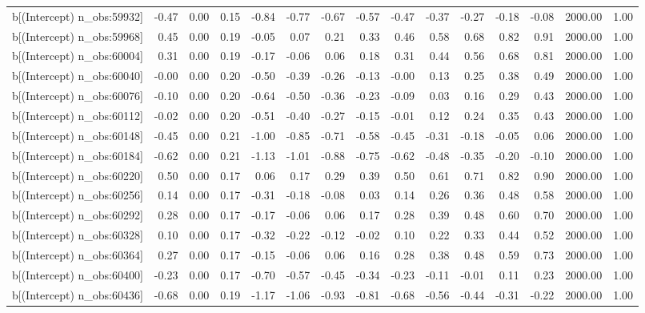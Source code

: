 \begin{table}[ht]
\begin{tabular}{rrrrrrrrrrrrrrr}
  b[(Intercept) n\_obs:59932] & -0.47 & 0.00 & 0.15 & -0.84 & -0.77 & -0.67 & -0.57 & -0.47 & -0.37 & -0.27 & -0.18 & -0.08 & 2000.00 & 1.00 \\ 
  b[(Intercept) n\_obs:59968] & 0.45 & 0.00 & 0.19 & -0.05 & 0.07 & 0.21 & 0.33 & 0.46 & 0.58 & 0.68 & 0.82 & 0.91 & 2000.00 & 1.00 \\ 
  b[(Intercept) n\_obs:60004] & 0.31 & 0.00 & 0.19 & -0.17 & -0.06 & 0.06 & 0.18 & 0.31 & 0.44 & 0.56 & 0.68 & 0.81 & 2000.00 & 1.00 \\ 
  b[(Intercept) n\_obs:60040] & -0.00 & 0.00 & 0.20 & -0.50 & -0.39 & -0.26 & -0.13 & -0.00 & 0.13 & 0.25 & 0.38 & 0.49 & 2000.00 & 1.00 \\ 
  b[(Intercept) n\_obs:60076] & -0.10 & 0.00 & 0.20 & -0.64 & -0.50 & -0.36 & -0.23 & -0.09 & 0.03 & 0.16 & 0.29 & 0.43 & 2000.00 & 1.00 \\ 
  b[(Intercept) n\_obs:60112] & -0.02 & 0.00 & 0.20 & -0.51 & -0.40 & -0.27 & -0.15 & -0.01 & 0.12 & 0.24 & 0.35 & 0.43 & 2000.00 & 1.00 \\ 
  b[(Intercept) n\_obs:60148] & -0.45 & 0.00 & 0.21 & -1.00 & -0.85 & -0.71 & -0.58 & -0.45 & -0.31 & -0.18 & -0.05 & 0.06 & 2000.00 & 1.00 \\ 
  b[(Intercept) n\_obs:60184] & -0.62 & 0.00 & 0.21 & -1.13 & -1.01 & -0.88 & -0.75 & -0.62 & -0.48 & -0.35 & -0.20 & -0.10 & 2000.00 & 1.00 \\ 
  b[(Intercept) n\_obs:60220] & 0.50 & 0.00 & 0.17 & 0.06 & 0.17 & 0.29 & 0.39 & 0.50 & 0.61 & 0.71 & 0.82 & 0.90 & 2000.00 & 1.00 \\ 
  b[(Intercept) n\_obs:60256] & 0.14 & 0.00 & 0.17 & -0.31 & -0.18 & -0.08 & 0.03 & 0.14 & 0.26 & 0.36 & 0.48 & 0.58 & 2000.00 & 1.00 \\ 
  b[(Intercept) n\_obs:60292] & 0.28 & 0.00 & 0.17 & -0.17 & -0.06 & 0.06 & 0.17 & 0.28 & 0.39 & 0.48 & 0.60 & 0.70 & 2000.00 & 1.00 \\ 
  b[(Intercept) n\_obs:60328] & 0.10 & 0.00 & 0.17 & -0.32 & -0.22 & -0.12 & -0.02 & 0.10 & 0.22 & 0.33 & 0.44 & 0.52 & 2000.00 & 1.00 \\ 
  b[(Intercept) n\_obs:60364] & 0.27 & 0.00 & 0.17 & -0.15 & -0.06 & 0.06 & 0.16 & 0.28 & 0.38 & 0.48 & 0.59 & 0.73 & 2000.00 & 1.00 \\ 
  b[(Intercept) n\_obs:60400] & -0.23 & 0.00 & 0.17 & -0.70 & -0.57 & -0.45 & -0.34 & -0.23 & -0.11 & -0.01 & 0.11 & 0.23 & 2000.00 & 1.00 \\ 
  b[(Intercept) n\_obs:60436] & -0.68 & 0.00 & 0.19 & -1.17 & -1.06 & -0.93 & -0.81 & -0.68 & -0.56 & -0.44 & -0.31 & -0.22 & 2000.00 & 1.00 \\ 

\end{tabular}
\end{table}
